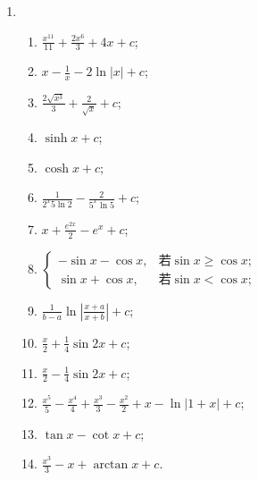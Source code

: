 % 
\begin{enumerate}
    \item %
        \begin{enumerate}[(1)]
            \item %
                $\displaystyle{
                    \frac{x^{11}}{11} + \frac{2x^6}{3} + 4x + c
                }$;
            \item %
                $\displaystyle{
                    x - \frac1x - 2\ln|x| + c
                }$;
            \item %
                $\displaystyle{
                    \frac{2\sqrt{x^3}}{3} + \frac{2}{\sqrt{x}} + c
                }$;
            \item %
                $\sinh x + c$;
            \item %
                $\cosh x + c$;
            \item %
                $\displaystyle{
                    \frac{1}{2^x5\ln2} - \frac{2}{5^x\ln5} + c
                }$;
            \item %
                $\displaystyle{
                    x + \frac{e^{2x}}{2} - e^x + c
                }$;
            \item %
                $
                    \begin{cases}
                        -\sin x - \cos x, & \text{若} \sin x \geqslant \cos x; \\
                        \sin x + \cos x, & \text{若} \sin x < \cos x;
                    \end{cases}
                $
            \item %
                $\displaystyle{
                    \frac{1}{b-a}\ln\left|\frac{x+a}{x+b}\right| + c
                }$;
            \item %
                $\displaystyle{
                    \frac{x}{2} + \frac14\sin 2x + c
                }$;
            \item %
                $\displaystyle{
                    \frac{x}{2} - \frac14\sin 2x + c
                }$;
            \item %
                $\displaystyle{
                    \frac{x^5}{5} - \frac{x^4}{4} + \frac{x^3}{3} - \frac{x^2}{2} + x - \ln|1+x| + c
                }$;
            \item %
                $\tan x - \cot x + c$;
            \item %
                $\displaystyle{
                    \frac{x^3}{3} - x + \arctan x + c
                }$.
        \end{enumerate}
\end{enumerate}
% 